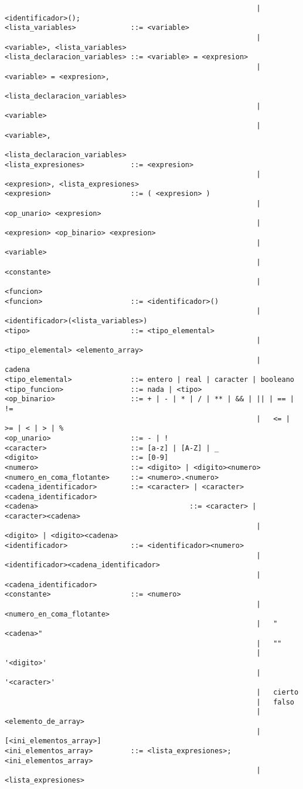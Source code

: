 \begin{verbatim}
															| 	<identificador>();
<lista_variables>             ::= <variable>
															| 	<variable>, <lista_variables>
<lista_declaracion_variables> ::= <variable> = <expresion>
															| 	<variable> = <expresion>, 		
																	<lista_declaracion_variables>
															|		<variable>
															| 	<variable>, 		
																	<lista_declaracion_variables>
<lista_expresiones>           ::= <expresion>
															| 	<expresion>, <lista_expresiones>
<expresion>                   ::= ( <expresion> )
															| 	<op_unario> <expresion>
															| 	<expresion> <op_binario> <expresion>
															| 	<variable>
															| 	<constante>
															| 	<funcion>
<funcion>                     ::= <identificador>()
															| 	<identificador>(<lista_variables>)
<tipo>                        ::= <tipo_elemental>
															| 	<tipo_elemental> <elemento_array>
															|		cadena
<tipo_elemental>              ::= entero | real | caracter | booleano
<tipo_funcion>	              ::= nada | <tipo>
<op_binario>                  ::= + | - | * | / | ** | && | || | == | !=
															| 	<= | >= | < | > | %
<op_unario>                   ::= - | !
<caracter>                    ::= [a-z] | [A-Z] | _
<digito>                      ::= [0-9]
<numero>                      ::= <digito> | <digito><numero>
<numero_en_coma_flotante>     ::= <numero>.<numero>
<cadena_identificador>        ::= <caracter> | <caracter><cadena_identificador>
<cadena>        							::= <caracter> | <caracter><cadena>
															|		<digito> | <digito><cadena>
<identificador>               ::= <identificador><numero>
															| 	<identificador><cadena_identificador>
															| 	<cadena_identificador>
<constante>                   ::= <numero>
															| 	<numero_en_coma_flotante>
															| 	"<cadena>"
															| 	""
															|		'<digito>'
															|		'<caracter>'
															| 	cierto
															| 	falso
															| 	<elemento_de_array>
															| 	[<ini_elementos_array>]
<ini_elementos_array>         ::= <lista_expresiones>; <ini_elementos_array>
															| 	<lista_expresiones>
\end{verbatim}


